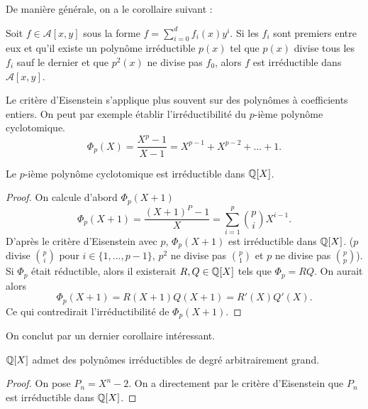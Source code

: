 \documentclass[../main.tex]{subfiles}
\begin{document}
De manière générale, on a le corollaire suivant :
\begin{corollary} Soit \(f\in \mathcal{A}[x,y]\) sous la forme \(f = \sum_{i=0}^d f_i(x)y^i\). 
    Si les \(f_i\) sont premiers entre eux et qu'il existe un polynôme irréductible \(p(x)\) tel que 
    \(p(x)\) divise tous les \(f_i\) sauf le dernier et que \(p^2(x)\) ne divise pas \(f_0\), alors \(f\) est irréductible dans \(\mathcal{A}[x,y]\).
\end{corollary}
Le critère d'Eisenstein s'applique plus souvent sur des polynômes à coefficients entiers.
On peut par exemple établir l'irréductibilité du \(p\)-ième polynôme cyclotomique.
\begin{equation}
    \Phi_p(X) = \frac{X^p-1}{X-1} = X^{p-1} + X^{p-2} + \ldots + 1.
\end{equation}
\begin{corollary}
    Le \(p\)-ième polynôme cyclotomique est irréductible dans \(\mathbb{Q}[X]\).
\end{corollary}
\begin{proof} On calcule d'abord \(\Phi_p(X+1)\)
    \begin{equation}
        \Phi_p(X+1) = \frac{(X+1)^P-1}{X} = \sum_{i=1}^p \binom{p}{i}X^{i-1}.
    \end{equation}
    D'après le critère d'Eisenstein avec \(p\), \(\Phi_p(X+1)\) est irréductible dans \(\mathbb{Q}[X]\).
    (\(p\) divise \(\binom{p}{i}\) pour \(i\in\{1,...,p-1\}\), \(p^2\) ne divise pas \(\binom{p}{1}\) et \(p\) ne divise pas \(\binom{p}{p}\)). 
    Si \(\Phi_p\) était réductible, alors il existerait \(R,Q\in \mathbb{Q}[X]\) tels que \(\Phi_p = RQ\). On aurait alors
    \begin{equation}
        \Phi_p(X+1) = R(X+1)Q(X+1) = R'(X)Q'(X).
    \end{equation}
    Ce qui contredirait l'irréductibilité de \(\Phi_p(X+1)\).
\end{proof}
On conclut par un dernier corollaire intéressant.
\begin{corollary} \(\mathbb{Q}[X]\) admet des polynômes irréductibles de degré arbitrairement grand.
\end{corollary}
\begin{proof} On pose \(P_n = X^n - 2\). On a directement par le critère d'Eisenstein que \(P_n\) est irréductible dans \(\mathbb{Q}[X]\).
\end{proof}
\end{document}
